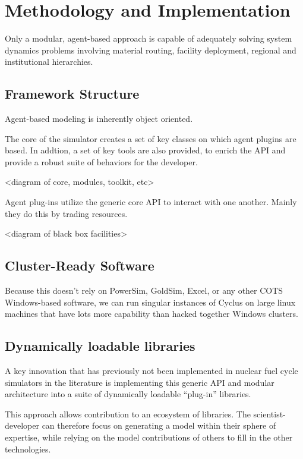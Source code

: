 \section{Methodology and Implementation}

Only a modular, agent-based approach is capable of adequately solving system 
dynamics problems involving material routing, facility deployment, regional and 
institutional hierarchies.

\subsection{Framework Structure}

Agent-based modeling is inherently object oriented. 

The core of the simulator creates a set of key classes on which agent plugins 
are based. In addtion, a set of key tools are also provided, to enrich the API 
and provide a robust suite of behaviors for the developer.

<diagram of core, modules, toolkit, etc>

Agent plug-ins utilize the generic core API to interact with one another. 
Mainly they do this by trading resources. 

<diagram of black box facilities>

\subsection{Cluster-Ready Software}

Because this doesn't rely on PowerSim, GoldSim, Excel, or any other COTS 
Windows-based software, we can run singular instances of Cyclus 
on large linux machines that have lots more capability than hacked together 
Windows clusters. 

\subsection{Dynamically loadable libraries}

A key innovation that has previously not been implemented in nuclear fuel cycle 
simulators in the literature is implementing this generic API and modular 
architecture into a suite of dynamically loadable ``plug-in'' libraries. 

This approach allows contribution to an ecosystem of libraries. The 
scientist-developer can therefore focus on generating a model within their 
sphere of expertise, while relying on the model contributions of others to fill 
in the other technologies.

